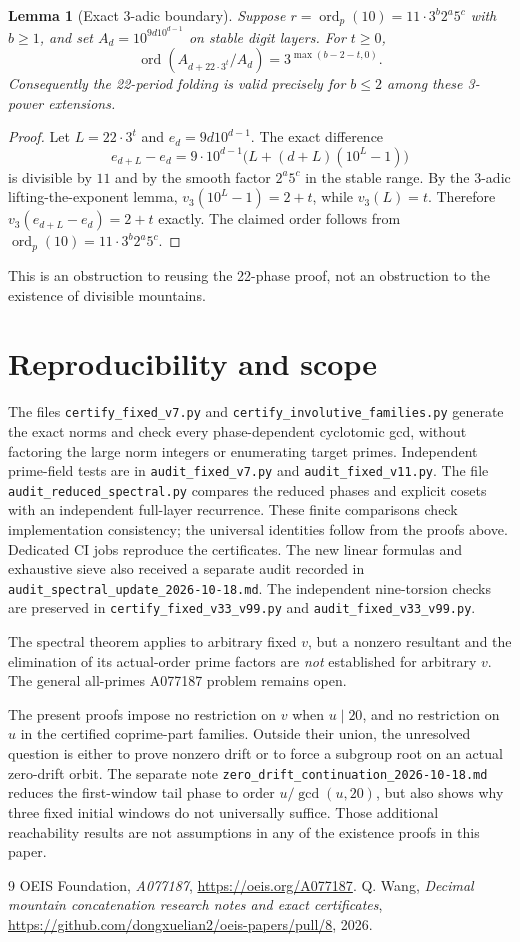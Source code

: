 \documentclass[10pt]{article}
\newtheorem{lemma}{Lemma}
\DeclareMathOperator{\ord}{ord}
\begin{document}
\begin{lemma}[Exact 3-adic boundary]
Suppose \(r=\ord_p(10)=11\cdot3^b2^a5^c\) with
\(b\ge1\), and set \(A_d=10^{9d10^{d-1}}\) on stable
digit layers. For \(t\ge0\),
\[
\boxed{
\ord(A_{d+22\cdot3^t}/A_d)
=3^{\max(b-2-t,0)}.}
\]
Consequently the 22-period folding is valid
precisely for \(b\le2\) among these 3-power extensions.
\end{lemma}
\begin{proof}
Let \(L=22\cdot3^t\) and \(e_d=9d10^{d-1}\).
The exact difference
\[
e_{d+L}-e_d=
9\cdot10^{d-1}\bigl(L+(d+L)(10^L-1)\bigr)
\]
is divisible by \(11\) and by the smooth factor
\(2^a5^c\) in the stable range.
By the 3-adic lifting-the-exponent lemma,
\(v_3(10^L-1)=2+t\), while \(v_3(L)=t\).
Therefore \(v_3(e_{d+L}-e_d)=2+t\) exactly.
The claimed order follows from
\(\ord_p(10)=11\cdot3^b2^a5^c\).
\end{proof}

This is an obstruction to reusing the 22-phase proof, not an
obstruction to the existence of divisible mountains.

\clearpage
\section{Reproducibility and scope}
The files \texttt{certify\_fixed\_v7.py} and
\texttt{certify\_involutive\_families.py} generate the exact norms and
check every phase-dependent cyclotomic gcd, without factoring
the large norm integers or enumerating target primes.
Independent prime-field tests are in
\texttt{audit\_fixed\_v7.py} and \texttt{audit\_fixed\_v11.py}.
The file \texttt{audit\_reduced\_spectral.py} compares the reduced
phases and explicit cosets with an independent full-layer recurrence.
These finite comparisons check implementation consistency; the universal
identities follow from the proofs above. Dedicated CI jobs reproduce
the certificates. The new linear formulas and exhaustive sieve also
received a separate audit recorded in
\texttt{audit\_spectral\_update\_2026-10-18.md}.
The independent nine-torsion checks are preserved in
\texttt{certify\_fixed\_v33\_v99.py} and
\texttt{audit\_fixed\_v33\_v99.py}.

The spectral theorem applies to arbitrary fixed \(v\), but a
nonzero resultant and the elimination of its actual-order
prime factors are \emph{not} established for arbitrary \(v\).
The general all-primes A077187 problem remains open.

The present proofs impose no restriction on \(v\) when \(u\mid20\),
and no restriction on \(u\) in the certified coprime-part families.
Outside their union, the unresolved question is either to prove nonzero
drift or to force a subgroup root on an actual zero-drift orbit.
The separate note \texttt{zero\_drift\_continuation\_2026-10-18.md}
reduces the first-window tail phase to order \(u/\gcd(u,20)\), but
also shows why three fixed initial windows do not universally suffice.
Those additional reachability results are not assumptions in any of
the existence proofs in this paper.

\begin{thebibliography}{9}
 OEIS Foundation,
\emph{A077187}, \url{https://oeis.org/A077187}.
 Q. Wang,
\emph{Decimal mountain concatenation research notes and exact certificates},
\url{https://github.com/dongxuelian2/oeis-papers/pull/8}, 2026.
\end{thebibliography}
\end{document}
